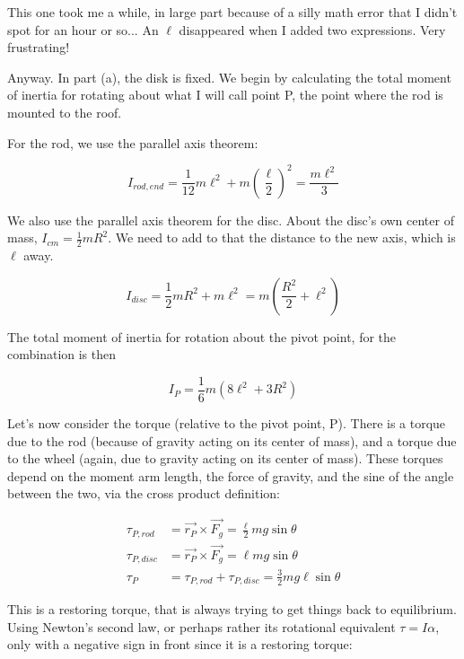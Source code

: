 \documentclass[8.01x]{subfiles}
\begin{document}
This one took me a while, in large part because of a silly math error that I didn't spot for an hour or so... An $\ell$ disappeared when I added two expressions. Very frustrating!

Anyway. In part (a), the disk is fixed. We begin by calculating the total moment of inertia for rotating about what I will call point P, the point where the rod is mounted to the roof.

For the rod, we use the parallel axis theorem:

\begin{equation}
I_{rod,end} = \frac{1}{12} m \ell^2 + m \left(\frac{\ell}{2}\right)^2 = \frac{m \ell^2}{3}
\end{equation}

We also use the parallel axis theorem for the disc. About the disc's own center of mass, $I_{cm} = \frac{1}{2} m R^2$. We need to add to that the distance to the new axis, which is $\ell$ away.

\begin{equation}
I_{disc} = \frac{1}{2} m R^2 + m \ell^2 = m \left( \frac{R^2}{2} + \ell^2 \right)
\end{equation}

The total moment of inertia for rotation about the pivot point, for the combination is then

\begin{equation}
I_P = \frac{1}{6} m (8 \ell^2 + 3 R^2)
\end{equation}

Let's now consider the torque (relative to the pivot point, P). There is a torque due to the rod (because of gravity acting on its center of mass), and a torque due to the wheel (again, due to gravity acting on its center of mass). These torques depend on the moment arm length, the force of gravity, and the sine of the angle between the two, via the cross product definition:

\begin{align}
\tau_{P,rod}  &= \vec{r_P} \times \vec{F_g} = \frac{\ell}{2} m g \sin \theta\\
\tau_{P,disc} &= \vec{r_P} \times \vec{F_g} = \ell m g \sin \theta\\
\tau_P        &= \tau_{P,rod} + \tau_{P,disc} = \frac{3}{2} m g \ell \sin \theta
\end{align}

This is a restoring torque, that is always trying to get things back to equilibrium. Using Newton's second law, or perhaps rather its rotational equivalent $\tau = I \alpha$, only with a negative sign in front since it is a restoring torque:
\end{document}
